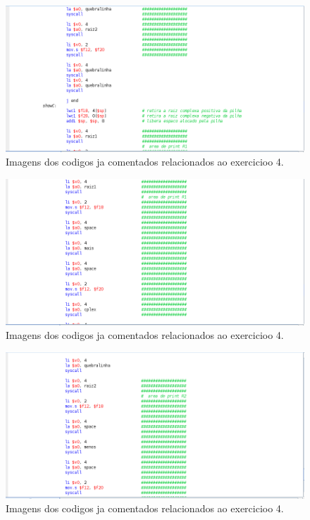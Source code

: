 \documentclass[12pt]{article}
\begin{document}
\begin{figure}[H]
	\centering
	\includegraphics[width=1\textwidth]{EX_4_9.png}
	\caption{Imagens dos codigos ja comentados relacionados ao exercicioo 4.}
	\label{fig:hilo}
\end{figure}

\begin{figure}[H]
	\centering
	\includegraphics[width=1\textwidth]{EX_4_10.png}
	\caption{Imagens dos codigos ja comentados relacionados ao exercicioo 4.}
	\label{fig:hilo}
\end{figure}

\begin{figure}[H]
	\centering
	\includegraphics[width=1\textwidth]{EX_4_11.png}
	\caption{Imagens dos codigos ja comentados relacionados ao exercicioo 4.}
	\label{fig:hilo}
\end{figure}
\end{document}
